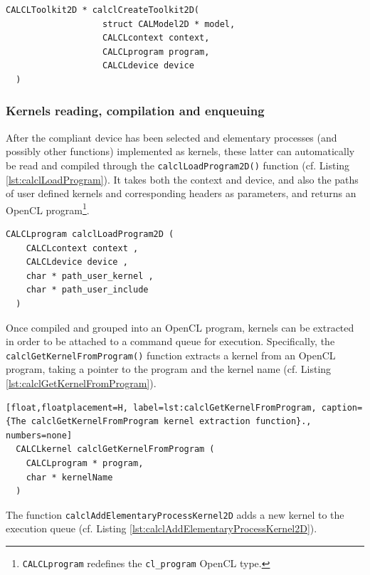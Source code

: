 \begin{lstlisting}[float,floatplacement=H, label=lst:calclCreateToolkit2D, caption=The calclCreateToolkit2D data structure., numbers=none]
  CALCLToolkit2D * calclCreateToolkit2D(
                   struct CALModel2D * model,
                   CALCLcontext context,
                   CALCLprogram program,
                   CALCLdevice device
  )
\end{lstlisting}


\subsubsection{Kernels reading, compilation and enqueuing}

After the compliant device has been selected and elementary processes
(and possibly other functions) implemented as kernels, these latter
can automatically be read and compiled through the
\verb'calclLoadProgram2D()' function (cf. Listing
\ref{lst:calclLoadProgram}). It takes both the context and device, and
also the paths of user defined kernels and corresponding headers as
parameters, and returns an OpenCL
program\footnote{\texttt{CALCLprogram} redefines the
  \texttt{cl\_program} OpenCL type.}.

\begin{lstlisting}[float,floatplacement=H, label=lst:calclLoadProgram, caption={The calclLoadProgramLib function. It loads and compiles kernels by returning an OpenCL program.}, numbers=none]
  CALCLprogram calclLoadProgram2D (
    CALCLcontext context ,
    CALCLdevice device ,
    char * path_user_kernel ,
    char * path_user_include
  )
\end{lstlisting}

Once compiled and grouped into an OpenCL program, kernels can be
extracted in order to be attached to a command queue for
execution. Specifically, the \verb'calclGetKernelFromProgram()'
function extracts a kernel from an OpenCL program, taking a pointer to
the program and the kernel name (cf. Listing
\ref{lst:calclGetKernelFromProgram}).

\begin{lstlisting}[float,floatplacement=H, label=lst:calclGetKernelFromProgram, caption={The calclGetKernelFromProgram kernel extraction function}., numbers=none]
  CALCLkernel calclGetKernelFromProgram (
    CALCLprogram * program,
    char * kernelName 
  )
\end{lstlisting}

The function \verb'calclAddElementaryProcessKernel2D' adds a new
kernel to the execution queue
(cf. Listing \ref{lst:calclAddElementaryProcessKernel2D}).

